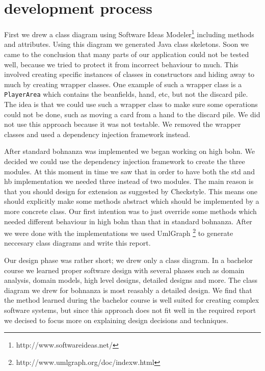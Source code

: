 \section{development process}
First we drew a class diagram using Software Ideas Modeler\footnote{http://www.softwareideas.net/} including methods and attributes. Using
this diagram we generated Java class skeletons. Soon we came to the conclusion that many parts of our application could not be
tested well, because we tried to protect it from incorrect behaviour to much. This involved creating specific instances of classes in
constructors and hiding away to much by creating wrapper classes. One example of such a wrapper class is a \texttt{PlayerArea} which
contains the beanfields, hand, etc, but not the discard pile. The idea is that we could use such a wrapper class to make sure some
operations could not be done, such as moving a card from a hand to the discard pile. We did not use this approach because it was not
testable. We removed the wrapper classes and used a dependency injection framework instead.

After standard bohnanza was implemented we began working on high bohn. We decided we could use the dependency injection framework to create
the three modules. At this moment in time we saw that in order to have both the \gls{std} and \gls{hb} implementation we needed three
instead of two modules. The main reason is that you should design for extension as suggested by Checkstyle. This means one should
explicitly make some methods abstract which should be implemented by a more concrete class. Our first intention was to just override some
methods which needed different behaviour in high bohn than that in standard bohnanza. After we were done with the implementations we used
UmlGraph \footnote{http://www.umlgraph.org/doc/indexw.html} to generate neccesary class diagrams and write this report. 

Our design phase was rather short; we drew only a class diagram. In a bachelor course we learned proper software design with several phases
such as domain analysis, domain models, high level designs, detailed designs and more. The class diagram we drew for bohnanza is most
reasably a detailed design. We find that the method learned during the bachelor course is well suited for creating complex software systems,
but since this approach does not fit well in the required report we decised to focus more on explaining design decisions and techniques.

